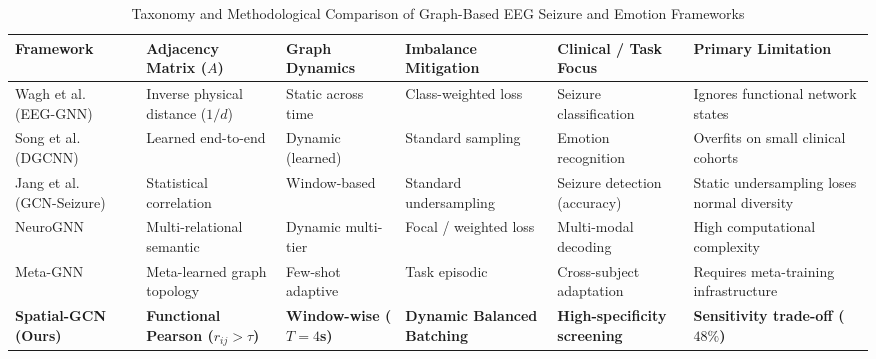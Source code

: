 \documentclass[journal]{IEEEtran}
\begin{document}
\begin{table}[!t]
\caption{Taxonomy and Methodological Comparison of Graph-Based EEG Seizure and Emotion Frameworks}
\label{tab:novelty_matrix}
\centering
\small
\begin{tabular}{@{}llllll@{}}
\toprule
\textbf{Framework} & \textbf{Adjacency Matrix ($A$)} & \textbf{Graph Dynamics} & \textbf{Imbalance Mitigation} & \textbf{Clinical / Task Focus} & \textbf{Primary Limitation} \\ \midrule
Wagh et al.~\cite{wagh} (EEG-GNN) & Inverse physical distance ($1/d$) & Static across time & Class-weighted loss & Seizure classification & Ignores functional network states \\
Song et al.~\cite{song} (DGCNN) & Learned end-to-end & Dynamic (learned) & Standard sampling & Emotion recognition & Overfits on small clinical cohorts \\
Jang et al.~\cite{jang} (GCN-Seizure) & Statistical correlation & Window-based & Standard undersampling & Seizure detection (accuracy) & Static undersampling loses normal diversity \\
NeuroGNN~\cite{neurognn2024} & Multi-relational semantic & Dynamic multi-tier & Focal / weighted loss & Multi-modal decoding & High computational complexity \\
Meta-GNN~\cite{metagnn2024} & Meta-learned graph topology & Few-shot adaptive & Task episodic & Cross-subject adaptation & Requires meta-training infrastructure \\
\textbf{Spatial-GCN (Ours)} & \textbf{Functional Pearson ($r_{ij} > \tau$)} & \textbf{Window-wise ($T=4$s)} & \textbf{Dynamic Balanced Batching} & \textbf{High-specificity screening} & \textbf{Sensitivity trade-off ($48\%$)} \\ \bottomrule
\end{tabular}
\end{table}
\end{document}
